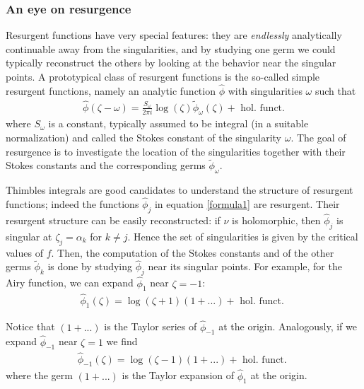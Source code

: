\documentclass{article}
\theoremstyle{definition}
\newcommand{\series}[1]{\tilde{#1}}
\begin{document}
\subsubsection{An eye on resurgence}\label{sec:eye-res-airy}
Resurgent functions have very special features: they are \textit{endlessly} analytically continuable away from the singularities, and by studying one germ we could typically reconstruct the others by looking at the behavior near the singular points. A prototypical class of resurgent functions is the so-called simple resurgent functions, namely an analytic function $\hat{\phi}$ with singularities $\omega$ such that 
\begin{align*}
    \hat{\phi}(\zeta-\omega)=\frac{S_\omega}{2\pi i} \log(\zeta) \series{\phi}_\omega(\zeta) + \text{ hol. funct.}
\end{align*}
where $S_\omega$ is a constant, typically assumed to be integral (in a suitable normalization) and called the Stokes constant of the singularity $\omega$. The goal of resurgence is to investigate the location of the singularities together with their Stokes constants and the corresponding germs $\series{\phi}_\omega$.  

Thimbles integrals are good candidates to understand the structure of resurgent functions; indeed the functions $\hat{\phi}_j$ in equation \eqref{formula1} are resurgent. Their resurgent structure can be easily reconstructed: if $\nu$ is holomorphic, then $\hat{\phi}_j$ is singular at $\zeta_j=\alpha_k$ for $k\neq j$. Hence the set of singularities is given by the critical values of $f$. Then, the computation of the Stokes constants and of the other germs $\series{\phi}_k$ is done by studying $\hat{\phi}_j$ near its singular points. For example, for the Airy function, we can expand $\hat{\phi}_1$ near $\zeta=-1$:
\begin{align*}
    \hat{\phi}_1(\zeta)=\log(\zeta+1) (1+...) +\text{ hol. funct. }
\end{align*}

Notice that $(1+...)$ is the Taylor series of $\hat{\phi}_{-1}$ at the origin. Analogously, if we expand $\hat{\phi}_{-1}$ near $\zeta=1$ we find
\begin{align*}
    \hat{\phi}_{-1}(\zeta)=\log(\zeta-1) (1+...) +\text{ hol. funct. }
\end{align*}
where the germ $(1+...)$ is the Taylor expansion of $\hat{\phi}_1$ at the origin. 
\end{document}
